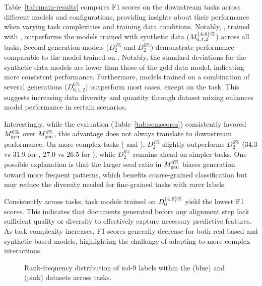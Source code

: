 Table~\ref{tab:main-results} compares F1 scores on the downstream tasks across different models and configurations, providing insights about their performance when varying task complexities and training data conditions. Notably, \mgover, trained with \dgover, outperforms the models trained with synthetic data ($M_{0,1,2}^{\{4,6\}\%}$) across all tasks. Second generation models ($D_{2}^{4\%}$ and $D_{2}^{6\%}$) demonstrate performance comparable to the model trained on \dgover. Notably, the standard deviations for the synthetic data models are lower than those of the gold data model, indicating more consistent performance. Furthermore, models trained on a combination of several generations ($D_{0,1,2}^{6\%}$) outperform most cases, except on the  task. This suggests increasing data diversity and quantity through dataset mixing enhances model performance in certain scenarios.

Interestingly, while the \score evaluation (Table~\ref{tab:semscores}) consistently favored $M_{\mathrm{gen}}^{6\%}$ over $M_{\mathrm{gen}}^{4\%}$, this advantage does not always translate to downstream performance. On more complex tasks ( and ), $D_{2}^{4\%}$ slightly outperforms $D_{2}^{6\%}$ ($34.3$ vs $31.9$ for , $27.0$ vs $26.5$ for ), while $D_{2}^{6\%}$ remains ahead on simpler tasks. One possible explanation is that the larger seed ratio in $M_{\mathrm{gen}}^{6\%}$ biases generation toward more frequent patterns, which benefits coarse-grained classification but may reduce the diversity needed for fine-grained tasks with rarer labels.

Consistently across  tasks, task models trained on $D_{0}^{\{4,6\}\%}$ yield the lowest F1 scores. This indicates that documents generated before any alignment step lack sufficient quality or diversity to effectively capture necessary predictive features. As task complexity increases, F1 scores generally decrease for both real-based and synthetic-based models, highlighting the challenge of adapting to more complex interactions.

\begin{figure}[htb]
    \centering
    \resizebox{0.65\columnwidth}{!}{}
    \caption{Rank-frequency distribution of \gls{icd}-9 labels within the \dgold (blue) and \dte (pink) datasets across  tasks.}
    \label{tab:datasets-distibutionline}
\end{figure}

